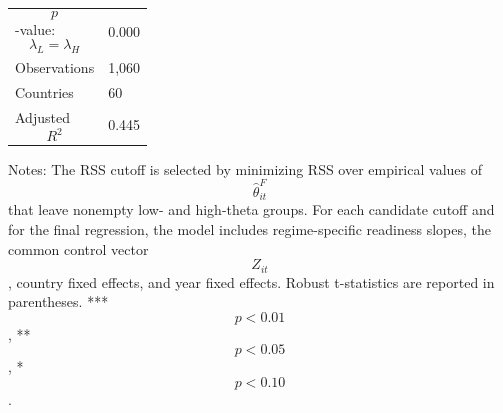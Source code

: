 \begin{table}[H]
\begin{threeparttable}
\begin{tabularx}{\textwidth}{lY}
$$p$$-value: $$\lambda_L=\lambda_H$$ & 0.000 \\
Observations & 1,060 \\
Countries & 60 \\
Adjusted $$R^2$$ & 0.445 \\
\bottomrule
\end{tabularx}
\begin{tablenotes}[flushleft]\footnotesize
\item Notes: The RSS cutoff is selected by minimizing RSS over empirical values of $$\widehat{\theta}^{F}_{it}$$ that leave nonempty low- and high-theta groups. For each candidate cutoff and for the final regression, the model includes regime-specific readiness slopes, the common control vector $$Z_{it}$$, country fixed effects, and year fixed effects. Robust t-statistics are reported in parentheses. *** $$p<0.01$$, ** $$p<0.05$$, * $$p<0.10$$.
\end{tablenotes}
\end{threeparttable}
\end{table}
